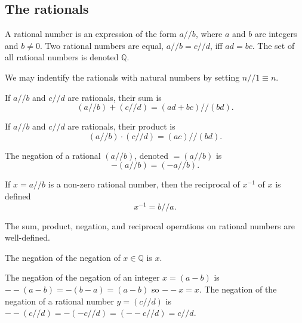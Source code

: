 \documentclass{article}
\begin{document}
\subsection{The rationals}
\begin{definition}
	A rational number is an expression of the form \(a//b\), where \(a\) and \(b\) are integers and \(b\neq 0\). Two rational numbers are equal, \(a//b=c//d\), iff \(ad=bc\). The set of all rational numbers is denoted \(\mathbb{Q}\).
\end{definition}
\begin{remark}
We may indentify the rationals with natural numbers by setting \(n//1\equiv n\).
\end{remark}
\begin{definition}
	If \(a//b\) and \(c//d\) are rationals, their sum is
	\begin{equation*}
		(a//b)+(c//d)=(ad+bc)//(bd).
	\end{equation*}
\end{definition}
\begin{definition}
	If \(a//b\) and \(c//d\) are rationals, their product is
	\begin{equation*}
		(a//b)\cdot(c//d)=(ac)//(bd).
	\end{equation*}
\end{definition}
\begin{definition}
	The negation of a rational \((a//b)\), denoted \(=(a//b)\) is
	\begin{equation*}
		-(a//b)=(-a//b).
	\end{equation*}
\end{definition}
\begin{definition}
	If \(x=a//b\) is a non-zero rational number, then the reciprocal of \(x^{-1}\) of \(x\) is defined
	\begin{equation*}
		x^{-1}=b//a.
	\end{equation*}
\end{definition}
\begin{lemma}
	The sum, product, negation, and reciprocal operations on rational numbers are well-defined.
\end{lemma}
\begin{proposition}
	\label{doublenegation}
	The negation of the negation of \(x\in\mathbb{Q}\) is \(x\).
	\begin{IEEEproof}
		The negation of the negation of an integer \(x=(a-b)\) is \(--(a-b)=-(b-a)=(a-b)\) so \(--x=x\). The negation of the negation of a rational number \(y=(c//d)\) is \(--(c//d)=-(-c//d)=(--c//d)=c//d\).
	\end{IEEEproof}
\end{proposition}
\end{document}
